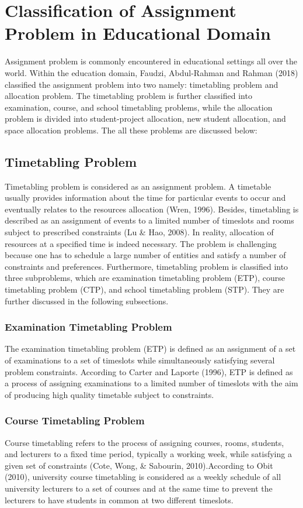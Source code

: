 \documentclass[11pt]{report}
\begin{document}
	\section{Classification of Assignment Problem in Educational Domain}
	Assignment problem is commonly encountered in educational settings all over the world. Within the education domain, Faudzi, Abdul-Rahman and Rahman (2018) classified the assignment problem into two namely: timetabling problem and allocation problem. The timetabling problem is further classified into examination, course, and school timetabling problems, while the allocation problem is divided into student-project allocation, new student allocation, and space allocation problems. The all these problems are discussed below:
	
	\subsection{Timetabling Problem}
	Timetabling problem is considered as an assignment problem. A timetable usually provides information about the time for particular events to occur and eventually relates to the resources allocation (Wren, 1996). Besides, timetabling is described as an assignment of events to a limited number of timeslots and rooms subject to prescribed constraints (Lu \& Hao, 2008). In reality, allocation of resources at a specified time is indeed necessary. The problem is challenging because one has to schedule a large number of entities and satisfy a number of constraints and preferences. Furthermore, timetabling problem is classified into three subproblems, which are examination timetabling problem (ETP), course timetabling problem (CTP), and school timetabling problem (STP). They are further discussed in the following subsections.
	
	\subsubsection{Examination Timetabling Problem}
	The examination timetabling problem (ETP) is defined as an assignment of a set of examinations to a set of timeslots while simultaneously satisfying several problem constraints. According to Carter and Laporte (1996), ETP is defined as a process of assigning examinations to a limited number of timeslots with the aim of producing high quality timetable subject to constraints.
	
	\subsubsection{Course Timetabling Problem}
	Course timetabling refers to the process of assigning courses, rooms, students, and lecturers to a fixed time period, typically a working week, while satisfying a given set of constraints (Cote, Wong, \& Sabourin, 2010).According to Obit (2010), university course timetabling is considered
	as a weekly schedule of all university lecturers to a set of courses and at the same time to prevent the lecturers to have students in common at two different timeslots.
	
\end{document}
